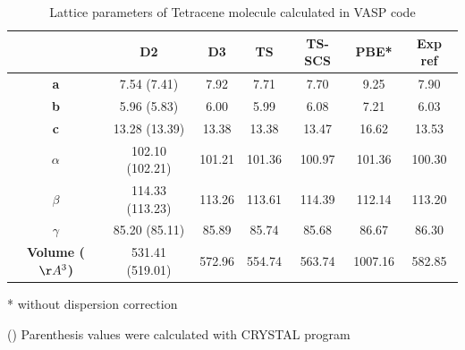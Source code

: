  \begin{table}[t]
 	\caption{Lattice parameters of Tetracene molecule calculated in VASP code} \label{table13}
 	\begin{center}
 	\begin{threeparttable}
 		\begin{tabular}{c c c c c c c}
 			\toprule
 			 & \textbf{D2} & \textbf{D3} & \textbf{TS} & \textbf{TS-SCS} & \textbf{PBE*} & \textbf{Exp} ref\cite{campbell1962crystal} \\
 			 \midrule
 			 \textbf{a} &7.54 (7.41) &  7.92 & 7.71 & 7.70 & 9.25 & 7.90\\
 			 \textbf{b}& 5.96 (5.83) & 6.00 & 5.99 & 6.08 & 7.21 & 6.03 \\
 			 \textbf{c}& 13.28 (13.39) & 13.38 & 13.38 & 13.47 & 16.62 & 13.53 \\
 			 \textbf{$\alpha$} & 102.10 (102.21) & 101.21 & 101.36 & 100.97 & 101.36 &100.30\\
 			 \textbf{$\beta$} & 114.33 (113.23) & 113.26 & 113.61 & 114.39 & 112.14 & 113.20\\
 			 \textbf{$\gamma$} &85.20 (85.11) & 85.89 & 85.74 & 85.68 & 86.67 & 86.30\\
 			 \textbf{Volume ($\AA^{3}$)} & 531.41 (519.01) & 572.96 & 554.74 &  563.74 & 1007.16 & 582.85\\
 			 \bottomrule
 		\end{tabular} 
 		
 		\begin{tablenotes}
 			\item[*] without dispersion correction
 			\item[()] Parenthesis values were calculated with CRYSTAL program
 		\end{tablenotes}
 	\end{threeparttable}
 	\end{center}
 \end{table}
 
